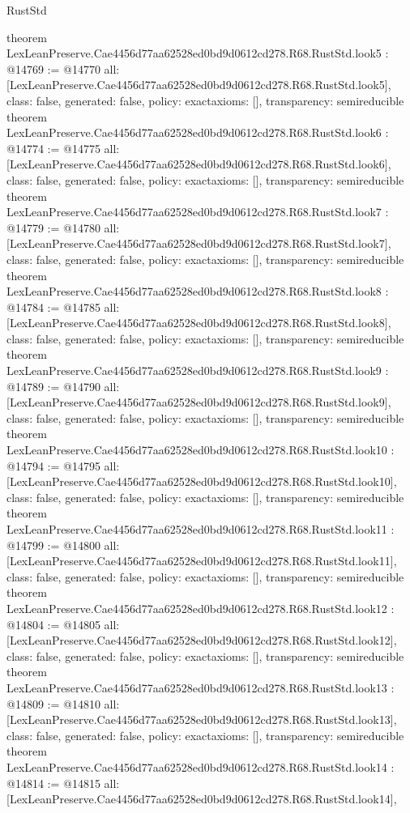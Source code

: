 \begin{lexlean}{RustStd}
\begin{coremodule}
{}
theorem LexLeanPreserve.Cae4456d77aa62528ed0bd9d0612cd278.R68.RustStd.look5 : @14769 := @14770 {
  all: [LexLeanPreserve.Cae4456d77aa62528ed0bd9d0612cd278.R68.RustStd.look5],
  class: false,
  generated: false,
  policy: exact{axioms: []},
  transparency: semireducible
}
theorem LexLeanPreserve.Cae4456d77aa62528ed0bd9d0612cd278.R68.RustStd.look6 : @14774 := @14775 {
  all: [LexLeanPreserve.Cae4456d77aa62528ed0bd9d0612cd278.R68.RustStd.look6],
  class: false,
  generated: false,
  policy: exact{axioms: []},
  transparency: semireducible
}
theorem LexLeanPreserve.Cae4456d77aa62528ed0bd9d0612cd278.R68.RustStd.look7 : @14779 := @14780 {
  all: [LexLeanPreserve.Cae4456d77aa62528ed0bd9d0612cd278.R68.RustStd.look7],
  class: false,
  generated: false,
  policy: exact{axioms: []},
  transparency: semireducible
}
theorem LexLeanPreserve.Cae4456d77aa62528ed0bd9d0612cd278.R68.RustStd.look8 : @14784 := @14785 {
  all: [LexLeanPreserve.Cae4456d77aa62528ed0bd9d0612cd278.R68.RustStd.look8],
  class: false,
  generated: false,
  policy: exact{axioms: []},
  transparency: semireducible
}
theorem LexLeanPreserve.Cae4456d77aa62528ed0bd9d0612cd278.R68.RustStd.look9 : @14789 := @14790 {
  all: [LexLeanPreserve.Cae4456d77aa62528ed0bd9d0612cd278.R68.RustStd.look9],
  class: false,
  generated: false,
  policy: exact{axioms: []},
  transparency: semireducible
}
theorem LexLeanPreserve.Cae4456d77aa62528ed0bd9d0612cd278.R68.RustStd.look10 : @14794 := @14795 {
  all: [LexLeanPreserve.Cae4456d77aa62528ed0bd9d0612cd278.R68.RustStd.look10],
  class: false,
  generated: false,
  policy: exact{axioms: []},
  transparency: semireducible
}
theorem LexLeanPreserve.Cae4456d77aa62528ed0bd9d0612cd278.R68.RustStd.look11 : @14799 := @14800 {
  all: [LexLeanPreserve.Cae4456d77aa62528ed0bd9d0612cd278.R68.RustStd.look11],
  class: false,
  generated: false,
  policy: exact{axioms: []},
  transparency: semireducible
}
theorem LexLeanPreserve.Cae4456d77aa62528ed0bd9d0612cd278.R68.RustStd.look12 : @14804 := @14805 {
  all: [LexLeanPreserve.Cae4456d77aa62528ed0bd9d0612cd278.R68.RustStd.look12],
  class: false,
  generated: false,
  policy: exact{axioms: []},
  transparency: semireducible
}
theorem LexLeanPreserve.Cae4456d77aa62528ed0bd9d0612cd278.R68.RustStd.look13 : @14809 := @14810 {
  all: [LexLeanPreserve.Cae4456d77aa62528ed0bd9d0612cd278.R68.RustStd.look13],
  class: false,
  generated: false,
  policy: exact{axioms: []},
  transparency: semireducible
}
theorem LexLeanPreserve.Cae4456d77aa62528ed0bd9d0612cd278.R68.RustStd.look14 : @14814 := @14815 {
  all: [LexLeanPreserve.Cae4456d77aa62528ed0bd9d0612cd278.R68.RustStd.look14],
}
\end{coremodule}
\end{lexlean}
